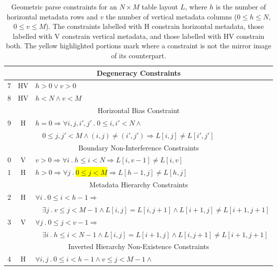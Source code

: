 \begin{table}[t]
    \centering
    \small
    \caption{Geometric parse constraints for an $N \times M$ table layout $L$, where $h$ is the number of horizontal metadata rows and $v$ the number of vertical metadata columns ($0 \leq h \leq N$, $0 \leq v \leq M$). The constraints labelled with H constrain horizontal metadata, those labelled with V constrain vertical metadata, and those labelled with HV constrain both. The yellow highlighted portions mark where a constraint is not the mirror image of its counterpart.}
    \begin{tabular}{|c|c|l|}
        \hline
        \multicolumn{3}{|c|}{Degeneracy Constraints}\\
        \hline
         7 & HV & $h > 0 \vee v > 0$\\
         8 & HV & $h < N \wedge v < M$\\
        \hline
        \multicolumn{3}{|c|}{Horizontal Bias Constraint}\\
        \hline
         9 & H & $h = 0 \Rightarrow \forall i, j, i', j'\ .\ 0 \leq i, i' < N \wedge $\\
         & & $\quad 0 \leq j, j' < M \wedge (i,j) \neq (i',j') \Rightarrow L[i,j] \neq L[i',j']$\\
        \hline
        \multicolumn{3}{|c|}{Boundary Non-Interference Constraints}\\
        \hline
         0 & V & $v > 0 \Rightarrow \forall i\ .\ h \leq i < N \Rightarrow L[i,v-1] \neq L[i,v]$\\
         1 & H & $h > 0 \Rightarrow \forall j\ .\ $\colorbox{yellow}{$0 \leq j < M$}$ \Rightarrow L[h-1,j] \neq L[h,j]$\\
        \hline
        \multicolumn{3}{|c|}{Metadata Hierarchy Constraints}\\
        \hline
         2 & H & $\forall i\ .\ 0 \leq i < h-1 \Rightarrow $\\
         & & $\quad \exists j\ .\ v \leq j < M-1 \wedge L[i,j] = L[i,j+1] \wedge L[i+1,j] \neq L[i+1,j+1]$\\
         3 & V & $\forall j\ .\ 0 \leq j < v-1 \Rightarrow $\\
         & & $\quad \exists i\ .\ h \leq i < N-1 \wedge L[i,j] = L[i+1,j] \wedge L[i,j+1] \neq L[i+1,j+1]$\\
        \hline
        \multicolumn{3}{|c|}{Inverted Hierarchy Non-Existence Constraints}\\
        \hline
         4 & H & $\forall i, j\ .\ 0 \leq i < h-1 \wedge v \leq j < M-1 \wedge $\\

\end{tabular}
\end{table}
